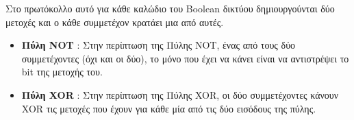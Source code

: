 %
%


Στο πρωτόκολλο αυτό για κάθε καλώδιο του Boolean δικτύου δημιουργούνται δύο μετοχές και ο κάθε συμμετέχον κρατάει μια από αυτές.

\begin{itemize}
    \item \textbf{Πύλη NOT} : Στην περίπτωση της Πύλης NOT, ένας από τους δύο συμμετέχοντες (όχι και οι δύο), το μόνο που έχει να κάνει είναι να αντιστρέψει το bit της μετοχής του.
    \item \textbf{Πύλη XOR} : Στην περίπτωση της Πύλης XOR, οι δύο συμμετέχοντες κάνουν XOR τις μετοχές που έχουν για κάθε μία από τις δύο εισόδους της πύλης.
\end{itemize}